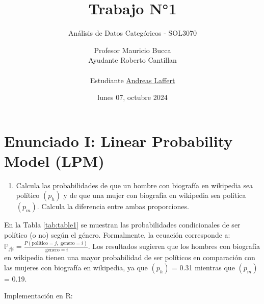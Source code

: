\documentclass[
  12pt,
  a4paper,
]{article}
\title{\vspace{5cm} Trabajo N°1}
\subtitle{Análisis de Datos Categóricos - SOL3070}
\author{Profesor Mauricio Bucca\\
Ayudante Roberto Cantillan\\
\vspace{8cm}\\
\hspace*{0.333em}Estudiante \href{mailto:alaffertt@estudiante.uc.cl}{Andreas Laffert}}
\date{lunes 07, octubre 2024}
\providecommand{\tightlist}{%
  \setlength{\itemsep}{0pt}\setlength{\parskip}{0pt}}
\begin{document}
\maketitle

\pagebreak

\hypertarget{enunciado-i-linear-probability-model-lpm}{%
\section{Enunciado I: Linear Probability Model (LPM)}\label{enunciado-i-linear-probability-model-lpm}}

\begin{enumerate}
\def\labelenumi{\arabic{enumi}.}
\tightlist
\item
  Calcula las probabilidades de que un hombre con biografía en wikipedia sea político \((p_h)\) y de que una mujer con biografía en wikipedia sea política \((p_m)\). Calcula la diferencia entre ambas proporciones.
\end{enumerate}

En la Tabla \ref{tab:table1} se muestran las probabilidades condicionales de ser político (o no) según el género. Formalmente, la ecuación corresponde a: \(\mathbb{P}_{j | i} = \frac{P(\text{politico}=j , \text{ genero}=i )}{\text{ genero}=i }\). Los resultados sugieren que los hombres con biografía en wikipedia tienen una mayor probabilidad de ser políticos en comparación con las mujeres con biografía en wikipedia, ya que \((p_h)\) = 0.31 mientras que \((p_m)\) = 0.19.

Implementación en R:
\end{document}
